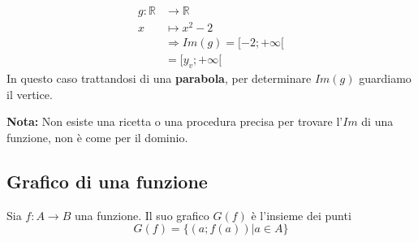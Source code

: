 \documentclass[../main.tex]{subfiles}
\begin{document}
\begin{center}
\end{center}

\begin{align*}
    g: \mathbb{R}& \longrightarrow \mathbb{R} \\
    x& \longmapsto x^2-2 \\
    &\Rightarrow Im(g)= \lbrack -2; + \infty \lbrack \\
    &= \lbrack y_v;+ \infty \lbrack
\end{align*}
In questo caso trattandosi di una \textbf{parabola}, per determinare $Im(g)$ guardiamo il vertice.

\textbf{Nota:} Non esiste una ricetta o una procedura precisa per trovare l'$Im$ di una funzione, non è come per il dominio.

\pagebreak
\subsection{Grafico di una funzione}
Sia $f:A \rightarrow B$ una funzione. Il suo grafico $G(f)$ è l'insieme dei punti 
$$
    G(f)= \{ (a;f(a)) | a \in A \}
$$
\end{document}
